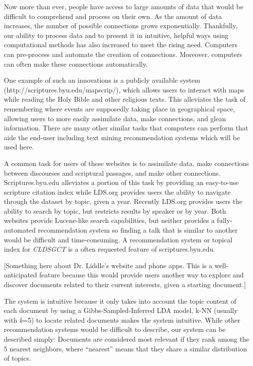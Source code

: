 Now more than ever, people have access to large amounts of data that would be difficult to comprehend and process on their own.  As the amount of data increases, the number of possible connections grows exponentially. Thankfully, our ability to process data and to present it in intuitive, helpful ways using computational methods has also increased to meet the rising need. Computers can pre-process and automate the creation of connections. Moreover, computers can often make these connections automatically. %

One example of such an innovations is a publicly available system (http://scriptures.byu.edu/mapscrip/), which allows users to interact with maps while reading the Holy Bible and other religious texts. This alleviates the task of remembering where events are supposedly taking place in geographical space, allowing users to more easily assimilate data, make connections, and glean information. There are many other similar tasks that computers can perform that aide the end-user including text mining recommendation systems which will be used here.  %

A common task for users of these websites is to assimilate data, make connections between discourses and scriptural passages, and make other connections. Scriptures.byu.edu alleviates a portion of this task by providing an easy-to-use scripture citation index while LDS.org provides users the ability to navigate through the dataset by topic, given a year. Recently LDS.org provides users the ability to search by topic, but restricts results by speaker or by year. Both websites provide Lucene-like search capabilities, but neither provides a fully-automated recommendation system so finding a talk that is similar to another would be difficult and time-consuming. A recommendation system or topical index for \emph{CLDSGCT} is a often requested feature of scriptures.byu.edu.

[Something here about Dr. Liddle's website and phone apps. This is a well-anticipated feature because this would provide users another way to explore and discover documents related to their current interests, given a starting document.]

The system is intuitive because it only takes into account the topic content of each document by using a Gibbs-Sampled-Inferred LDA model, k-NN (usually with \textit{k}=5) to locate related documents makes the system intuitive. While other recommendation systems would be difficult to describe, our system can be described simply: Documents are considered most relevant if they rank among the 5 nearest neighbors, where ``nearest'' means that they share a similar distribution of topics. %


